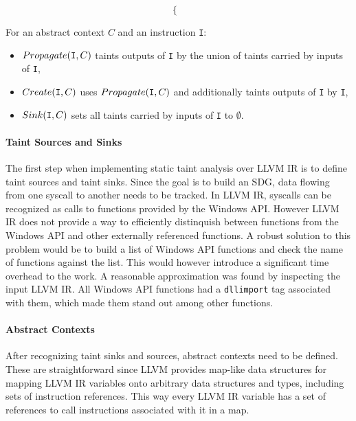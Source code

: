 \begin{defn}
\begin{itemize}
\begin{equation*}
\begin{cases}
            \end{cases}
        \end{equation*}
    \end{itemize}
For an abstract context $C$ and an instruction \texttt{I}:
\begin{itemize}
    \item $Propagate(\text{\texttt{I}}, C)$ taints outputs of \texttt{I} by the union of taints carried by inputs of \texttt{I},
    \item $Create(\text{\texttt{I}}, C)$ uses $Propagate(\text{\texttt{I}}, C)$ and additionally taints outputs of \texttt{I} by \texttt{I},
    \item $Sink(\text{\texttt{I}}, C)$ sets all taints carried by inputs of \texttt{I} to $\emptyset$.
\end{itemize}
\end{defn}

\paragraph*{Taint Sources and Sinks} The first step when implementing static taint analysis over \textsc{LLVM IR} is to define taint sources and taint sinks. Since the goal is to build an \textsc{SDG}, data flowing from one syscall to another needs to be tracked. In \textsc{LLVM IR}, syscalls can be recognized as calls to functions provided by the Windows API. However \textsc{LLVM IR} does not provide a way to efficiently distinquish between functions from the Windows API and other externally referenced functions. A robust solution to this problem would be to build a list of Windows API functions and check the name of functions against the list. This would however introduce a significant time overhead to the work. A reasonable approximation was found by inspecting the input \textsc{LLVM IR}. All Windows API functions had a \texttt{dllimport} tag associated with them, which made them stand out among other functions.

\paragraph*{Abstract Contexts} After recognizing taint sinks and sources, abstract contexts need to be defined. These are straightforward since \textsc{LLVM} provides map-like data structures for mapping \textsc{LLVM IR} variables onto arbitrary data structures and types, including sets of instruction references. This way every \textsc{LLVM IR} variable has a set of references to call instructions associated with it in a map.

